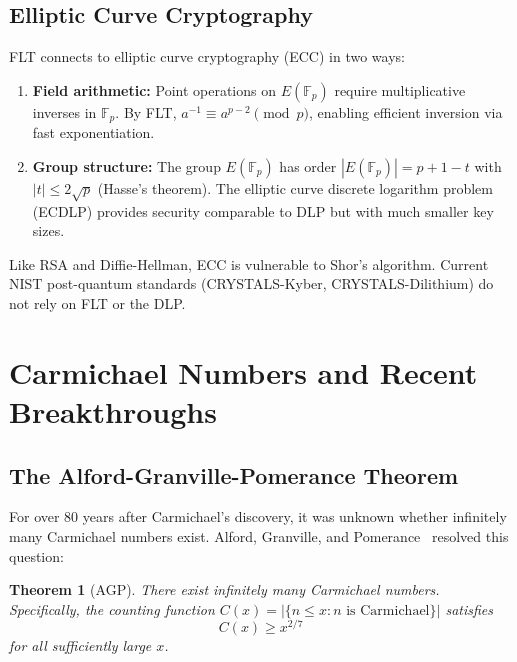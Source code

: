 \documentclass{amsart}
\theoremstyle{plain}
\newtheorem{theorem}{Theorem}[section]
\theoremstyle{definition}
\theoremstyle{remark}
\newcommand{\F}{\mathbb{F}}
\begin{document}
\subsection{Elliptic Curve Cryptography}

FLT connects to elliptic curve cryptography (ECC) in two ways:

\begin{enumerate}
\item \textbf{Field arithmetic:} Point operations on $E(\F_p)$ require multiplicative inverses in $\F_p$. By FLT, $a^{-1} \equiv a^{p-2} \pmod{p}$, enabling efficient inversion via fast exponentiation.

\item \textbf{Group structure:} The group $E(\F_p)$ has order $|E(\F_p)| = p + 1 - t$ with $|t| \le 2\sqrt{p}$ (Hasse's theorem). The elliptic curve discrete logarithm problem (ECDLP) provides security comparable to DLP but with much smaller key sizes.
\end{enumerate}

Like RSA and Diffie-Hellman, ECC is vulnerable to Shor's algorithm. Current NIST post-quantum standards (CRYSTALS-Kyber, CRYSTALS-Dilithium) do not rely on FLT or the DLP.

\section{Carmichael Numbers and Recent Breakthroughs}\label{sec:carmichael}

\subsection{The Alford-Granville-Pomerance Theorem}

For over 80 years after Carmichael's discovery, it was unknown whether infinitely many Carmichael numbers exist. Alford, Granville, and Pomerance~\cite{agp1994} resolved this question:

\begin{theorem}[AGP]\label{thm:agp}
There exist infinitely many Carmichael numbers. Specifically, the counting function $C(x) = |\{n \le x : n \text{ is Carmichael}\}|$ satisfies
\[
C(x) \ge x^{2/7}
\]
for all sufficiently large $x$.
\end{theorem}
\end{document}
